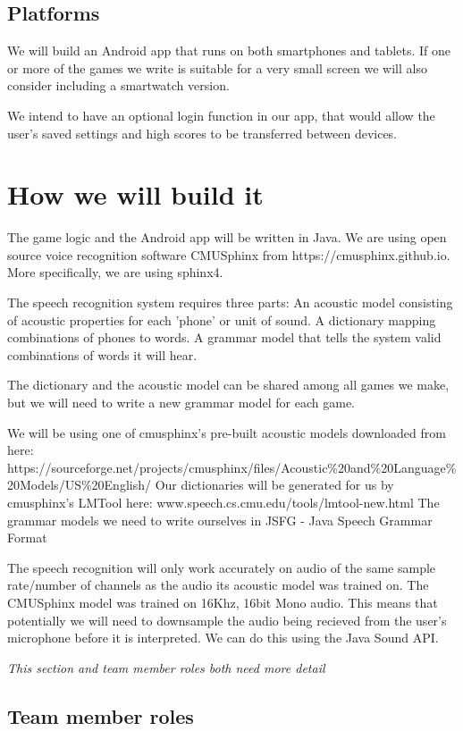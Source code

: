 \documentclass[11pt, oneside]{article}
\begin{document}
\subsection*{Platforms}

We will build an Android app that runs on both smartphones and
tablets. If one or more of the games we write is suitable for a very
small screen we will also consider including a smartwatch version.

We intend to have an optional login function in our app, that would
allow the user's saved settings and high scores to be transferred between
devices.


\section*{How we will build it}

The game logic and the Android app will be written in Java. We are
using open source voice recognition software CMUSphinx from 
https://cmusphinx.github.io. More specifically, we are using sphinx4.

The speech recognition system requires three parts:
An acoustic model consisting of acoustic properties for each 'phone' or unit of sound.
A dictionary mapping combinations of phones to words.
A grammar model that tells the system valid combinations of words it will hear.

The dictionary and the acoustic model can be shared among all games we make, but we
will need to write a new grammar model for each game.

We will be using one of cmusphinx's pre-built acoustic models downloaded from here: https://sourceforge.net/projects/cmusphinx/files/Acoustic\%20and\%20Language\%20Models/US\%20English/
Our dictionaries will be generated for us by cmusphinx's LMTool here: www.speech.cs.cmu.edu/tools/lmtool-new.html
The grammar models we need to write ourselves in JSFG - Java Speech Grammar Format

The speech recognition will only work accurately on audio of the same sample rate/number of channels 
as the audio its acoustic model was trained on. The CMUSphinx model was trained on 16Khz, 16bit Mono
audio. This means that potentially we will need to downsample the audio being recieved from the user's
microphone before it is interpreted. We can do this using the Java Sound API.

{\em This section and team member roles both need more detail}

\subsection*{Team member roles}
\end{document}
